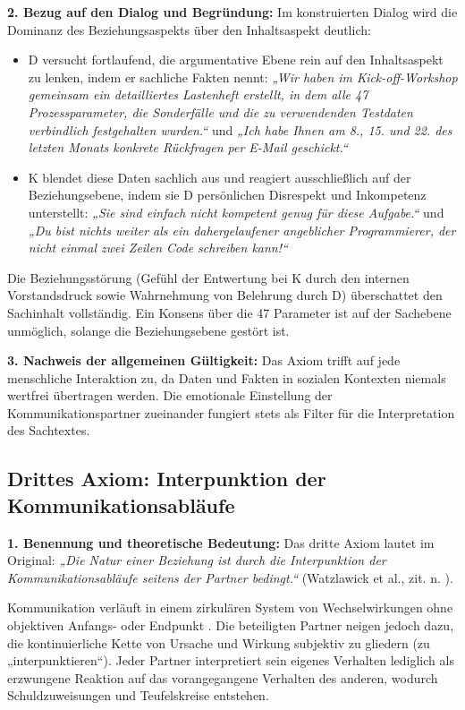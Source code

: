 \textbf{2. Bezug auf den Dialog und Begründung:}
Im konstruierten Dialog wird die Dominanz des Beziehungsaspekts über den Inhaltsaspekt deutlich:
\begin{itemize}
    \item D versucht fortlaufend, die argumentative Ebene rein auf den Inhaltsaspekt zu lenken, indem er sachliche Fakten nennt: \textit{„Wir haben im Kick-off-Workshop gemeinsam ein detailliertes Lastenheft erstellt, in dem alle 47 Prozessparameter, die Sonderfälle und die zu verwendenden Testdaten verbindlich festgehalten wurden.“} und \textit{„Ich habe Ihnen am 8., 15. und 22. des letzten Monats konkrete Rückfragen per E-Mail geschickt.“}
    \item K blendet diese Daten sachlich aus und reagiert ausschließlich auf der Beziehungsebene, indem sie D persönlichen Disrespekt und Inkompetenz unterstellt: \textit{„Sie sind einfach nicht kompetent genug für diese Aufgabe.“} und \textit{„Du bist nichts weiter als ein dahergelaufener angeblicher Programmierer, der nicht einmal zwei Zeilen Code schreiben kann!“}
\end{itemize}
Die Beziehungsstörung (Gefühl der Entwertung bei K durch den internen Vorstandsdruck sowie Wahrnehmung von Belehrung durch D) überschattet den Sachinhalt vollständig. Ein Konsens über die 47 Parameter ist auf der Sachebene unmöglich, solange die Beziehungsebene gestört ist.

\textbf{3. Nachweis der allgemeinen Gültigkeit:}
Das Axiom trifft auf jede menschliche Interaktion zu, da Daten und Fakten in sozialen Kontexten niemals wertfrei übertragen werden. Die emotionale Einstellung der Kommunikationspartner zueinander fungiert stets als Filter für die Interpretation des Sachtextes.

\subsection{Drittes Axiom: Interpunktion der Kommunikationsabläufe}

\textbf{1. Benennung und theoretische Bedeutung:}
Das dritte Axiom lautet im Original: \textit{„Die Natur einer Beziehung ist durch die Interpunktion der Kommunikationsabläufe seitens der Partner bedingt.“}  (Watzlawick et al., zit. n. \cite[S.~13]{3}).

Kommunikation verläuft in einem zirkulären System von Wechselwirkungen ohne objektiven Anfangs- oder Endpunkt \cite[S.~6--7]{3}. Die beteiligten Partner neigen jedoch dazu, die kontinuierliche Kette von Ursache und Wirkung subjektiv zu gliedern (zu „interpunktieren“). Jeder Partner interpretiert sein eigenes Verhalten lediglich als erzwungene Reaktion auf das vorangegangene Verhalten des anderen, wodurch Schuldzuweisungen und Teufelskreise entstehen.


